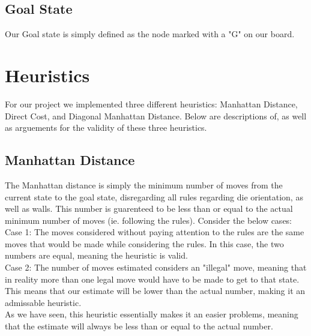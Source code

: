 \documentclass{article}
\begin{document}
\subsection*{Goal State}
Our Goal state is simply defined as the node marked with a "G" on our board.  
\section*{Heuristics}
For our project we implemented three different heuristics: Manhattan Distance, Direct Cost, and Diagonal Manhattan Distance.  Below are descriptions of, as well as arguements for the validity of these three heuristics.
\subsection*{Manhattan Distance}
The Manhattan distance is simply the minimum number of moves from the current state to the goal state, disregarding all rules regarding die orientation, as well as walls.  This number is guarenteed to be less than or equal to the actual minimum number of moves (ie. following the rules).  Consider the below cases:\\
Case 1: The moves considered without paying attention to the rules are the same moves that would be made while considering the rules.  In this case, the two numbers are equal, meaning the heuristic is valid.\\
Case 2: The number of moves estimated considers an "illegal" move, meaning that in reality more than one legal move would have to be made to get to that state.  This means that our estimate will be lower than the actual number, making it an admissable heuristic.\\
As we have seen, this heuristic essentially makes it an easier problems, meaning that the estimate will always be less than or equal to the actual number.  
\end{document}
